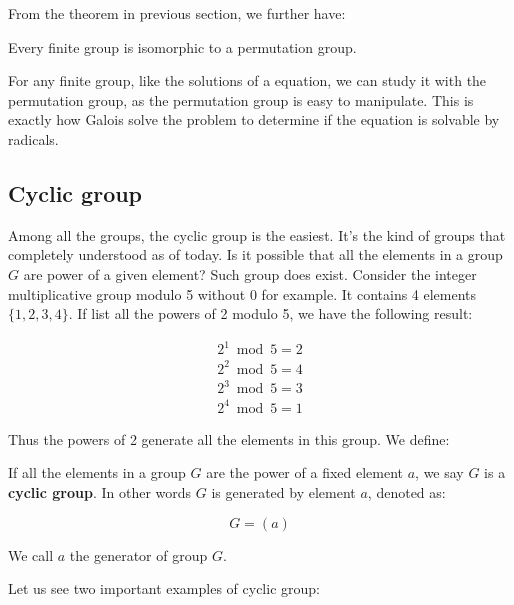 \documentclass{article}
\begin{document}
From the theorem in previous section, we further have:

\begin{theorem}
Every finite group is isomorphic to a permutation group.
\end{theorem}

For any finite group, like the solutions of a equation, we can study it with the permutation group, as the permutation group is easy to manipulate. This is exactly how Galois solve the problem to determine if the equation is solvable by radicals.

\begin{Exercise}
\end{Exercise}

\subsection{Cyclic group}

Among all the groups, the cyclic group is the easiest. It's the kind of groups that completely understood as of today. Is it possible that all the elements in a group $G$ are power of a given element? Such group does exist. Consider the integer multiplicative group modulo 5 without 0 for example. It contains 4 elements $\{1, 2, 3, 4\}$. If list all the powers of 2 modulo 5, we have the following result:

\[
\begin{array}{l}
2^1 \bmod 5 = 2 \\
2^2 \bmod 5 = 4 \\
2^3 \bmod 5 = 3 \\
2^4 \bmod 5 = 1
\end{array}
\]

Thus the powers of 2 generate all the elements in this group. We define:

\begin{definition}
If all the elements in a group $G$ are the power of a fixed element $a$, we say $G$ is a \textbf{cyclic group}. In other words $G$ is generated by element $a$, denoted as:

\[
G = (a)
\]

We call $a$ the generator of group $G$.
\end{definition}

Let us see two important examples of cyclic group:
\end{document}

